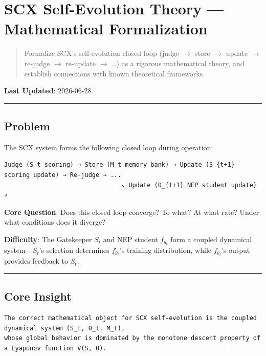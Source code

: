 \documentclass[
  12pt,
]{article}
\author{SCX}
\date{2026}
\begin{document}
\section{SCX Self-Evolution Theory ---
Mathematical Formalization}\label{scx-self-evolution-theory-mathematical-formalization}

\begin{quote}
Formalize SCX's self-evolution closed loop (judge $\to$ store $\to$ update $\to$ re-judge $\to$ re-update $\to$
\ldots) as a rigorous mathematical theory, and establish connections with known theoretical frameworks.
\end{quote}

\textbf{Last Updated}: 2026-06-28

\begin{center}\rule{0.5\linewidth}{0.5pt}\end{center}

\subsection{Problem}\label{problem}

The SCX system forms the following closed loop during operation:

\begin{verbatim}
Judge (S_t scoring) → Store (M_t memory bank) → Update (S_{t+1} scoring update) → Re-judge → ...
                                ↘ Update (θ_{t+1} NEP student update) ↗
\end{verbatim}

\textbf{Core Question}: Does this closed loop converge? To what? At what rate? Under what conditions does it diverge?

\textbf{Difficulty}: The Gatekeeper \(S_t\) and NEP student \(f_{\theta_t}\)
form a coupled dynamical system---\(S_t\)'s selection determines \(f_{\theta_t}\)'s
training distribution, while \(f_{\theta_t}\)'s output provides feedback to \(S_t\).

\begin{center}\rule{0.5\linewidth}{0.5pt}\end{center}

\subsection{Core Insight}\label{core-insight}

\begin{verbatim}
The correct mathematical object for SCX self-evolution is the coupled dynamical system (S_t, θ_t, M_t),
whose global behavior is dominated by the monotone descent property of a Lyapunov function V(S, θ).
\end{verbatim}
\end{document}
